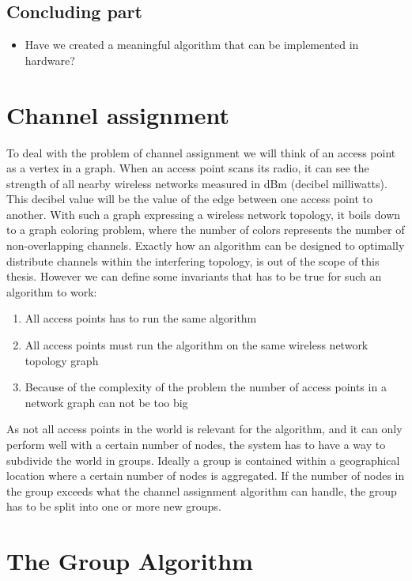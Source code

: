 \documentclass[11pt,a4paper,UKenglish]{report}
\begin{document}
\subsection {Concluding part}
\begin{itemize} 
	\item Have we created a meaningful algorithm that can be implemented in hardware?
\end{itemize}

\clearpage


\section{Channel assignment} 
To deal with the problem of channel assignment we will think of an access point as a vertex in a graph. When an access point scans its radio,
it can see the strength of all nearby wireless networks measured in dBm (decibel milliwatts). This decibel value will be
the value of the edge between one access point to another. With such a graph expressing a wireless network topology, it boils down
to a graph coloring problem, where the number of colors represents the number of non-overlapping channels. Exactly how an algorithm can be designed
to optimally distribute channels within the interfering topology, is out of the scope of this thesis. However we can define some invariants that has to be true
for such an algorithm to work:
\begin{enumerate} 
	\item All access points has to run the same algorithm
	\item All access points must run the algorithm on the same wireless network topology graph
	\item Because of the complexity of the problem the number of access points in a network graph can not be too big
\end{enumerate}


As not all access points in the world
is relevant for the algorithm, and it can only perform well with a certain number of nodes, the system has to have a way to subdivide
the world in groups. Ideally a group is contained within a geographical location where a certain number of nodes is aggregated. If the
number of nodes in the group exceeds what the channel assignment algorithm can handle, the group has to be split into one or more new groups. 

\section{The Group Algorithm} 
\end{document}
